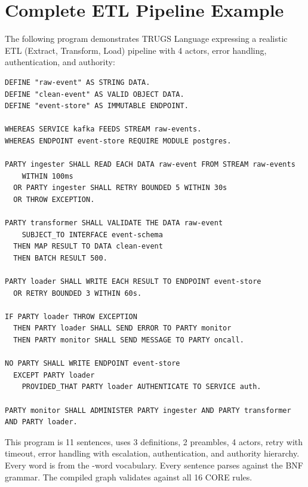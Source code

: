 \documentclass{article}
\begin{document}




\appendix

\section{Complete ETL Pipeline Example}

The following program demonstrates TRUGS Language expressing a realistic ETL (Extract, Transform, Load) pipeline with 4 actors, error handling, authentication, and authority:

\begin{lstlisting}[style=trugs]
DEFINE "raw-event" AS STRING DATA.
DEFINE "clean-event" AS VALID OBJECT DATA.
DEFINE "event-store" AS IMMUTABLE ENDPOINT.

WHEREAS SERVICE kafka FEEDS STREAM raw-events.
WHEREAS ENDPOINT event-store REQUIRE MODULE postgres.

PARTY ingester SHALL READ EACH DATA raw-event FROM STREAM raw-events
    WITHIN 100ms
  OR PARTY ingester SHALL RETRY BOUNDED 5 WITHIN 30s
  OR THROW EXCEPTION.

PARTY transformer SHALL VALIDATE THE DATA raw-event
    SUBJECT_TO INTERFACE event-schema
  THEN MAP RESULT TO DATA clean-event
  THEN BATCH RESULT 500.

PARTY loader SHALL WRITE EACH RESULT TO ENDPOINT event-store
  OR RETRY BOUNDED 3 WITHIN 60s.

IF PARTY loader THROW EXCEPTION
  THEN PARTY loader SHALL SEND ERROR TO PARTY monitor
  THEN PARTY monitor SHALL SEND MESSAGE TO PARTY oncall.

NO PARTY SHALL WRITE ENDPOINT event-store
  EXCEPT PARTY loader
    PROVIDED_THAT PARTY loader AUTHENTICATE TO SERVICE auth.

PARTY monitor SHALL ADMINISTER PARTY ingester AND PARTY transformer AND PARTY loader.
\end{lstlisting}

This program is 11 sentences, uses 3 definitions, 2 preambles, 4 actors, retry with timeout, error handling with escalation, authentication, and authority hierarchy. Every word is from the \VocabTotal-word vocabulary. Every sentence parses against the BNF grammar. The compiled graph validates against all 16 CORE rules.
\end{document}
